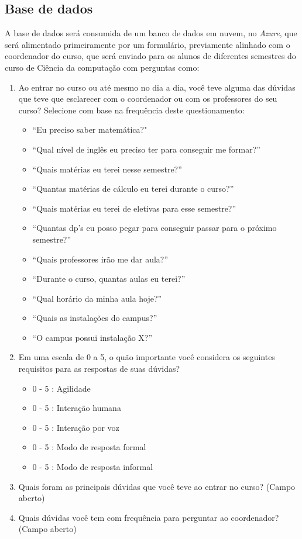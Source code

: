 \documentclass[
	12pt,				%
	oneside,
	a4paper,			%
	english,			%
	french,				%
	spanish,			%
	brazil				%
	]{abntex2}
\begin{document}
\subsection{Base de dados}
A base de dados será consumida de um banco de dados em nuvem, no \emph{Azure}, que será alimentado primeiramente por um formulário, previamente alinhado com o coordenador do curso, que será enviado para os alunos de diferentes semestres do curso de Ciência da computação com perguntas como:
\begin{enumerate}
\item Ao entrar no curso ou até mesmo no dia a dia, você teve alguma das dúvidas que teve que esclarecer com o coordenador ou com os professores do seu curso? Selecione com base na frequência deste questionamento:
\begin{itemize}
\item “Eu preciso saber matemática?"
\item “Qual nível de inglês eu preciso ter para conseguir me formar?”
\item “Quais matérias eu terei nesse semestre?”
\item “Quantas matérias de cálculo eu terei durante o curso?”
\item “Quais matérias eu terei de eletivas para esse semestre?”
\item “Quantas dp’s eu posso pegar para conseguir passar para o próximo semestre?”
\item “Quais professores irão me dar aula?”
\item “Durante o curso, quantas aulas eu terei?”
\item “Qual horário da minha aula hoje?”
\item “Quais as instalações do campus?”
\item“O campus possui instalação X?”
\end{itemize}

\item Em uma escala de 0 a 5, o quão importante você considera os seguintes requisitos para as respostas de suas dúvidas?
\begin{itemize}
\item 0 - 5 : Agilidade
\item 0 - 5 : Interação humana
\item 0 - 5 : Interação por voz
\item 0 - 5 : Modo de resposta formal
\item 0 - 5 : Modo de resposta informal
\end{itemize}

\item Quais foram as principais dúvidas que você teve ao entrar no curso? (Campo aberto)
\item Quais dúvidas você tem com frequência para perguntar ao coordenador? (Campo aberto)
\end{enumerate}
\end{document}

